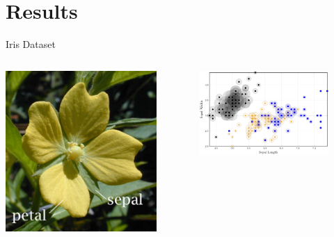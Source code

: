 \documentclass[smaller]{beamer}
\begin{document}
\section{Results}
\label{sec:org7f1c5cf}

\begin{frame}[label={sec:org05a722e}]{Iris Dataset}
\begin{columns}
\begin{column}{0.3\columnwidth}
\begin{center}
\includegraphics[width=1.0\textwidth]{images/Petal-sepal.jpg}
\end{center}
\end{column}

\begin{column}{0.7\columnwidth}
\begin{figure}
    \centering
    \includegraphics[width=\textwidth]{images/iris-eps.png}
    \label{fig:iris}
\end{figure}


\end{column}
\end{columns}
\end{frame}
\end{document}
